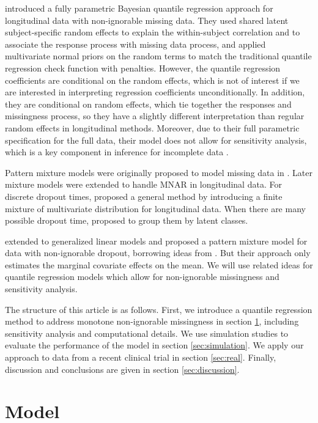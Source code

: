 \documentclass[useAMS,usenatbib,referee]{biom}
\begin{document}
\citet{yuan2010} introduced a fully parametric Bayesian quantile
regression approach for longitudinal data with non-ignorable missing
data. They used shared latent subject-specific random effects to
explain the within-subject correlation and to associate the response
process with missing data process, and applied multivariate normal
priors on the random terms to match the traditional quantile
regression check function with penalties. However, the quantile
regression coefficients are conditional on the random effects, which
is not of interest if we are interested in interpreting regression
coefficients unconditionally.  In addition, they are
conditional on random effects, which tie together the responses and
missingness process, so they have a slightly different interpretation
than regular random effects in longitudinal methods. Moreover, due to
their full parametric specification for the full data, their model
does not allow for sensitivity analysis, which is a key component in
inference for incomplete data \citep{nas2010}.

Pattern mixture models were originally proposed to model missing data
in \citet{rubin1977}. Later mixture models were extended to handle
MNAR in longitudinal data. For discrete dropout times,
\citet{little1993, little1994} proposed a general method by
introducing a finite mixture of multivariate distribution for
longitudinal data. When there are many possible dropout time,
\citet{roy2003} proposed to group them by latent classes.

\citet{roy2008} extended \citet{roy2003} to generalized linear models
and proposed a pattern mixture model for data with non-ignorable
dropout, borrowing ideas from \citet{heagerty1999}.  But their
approach only estimates the marginal covariate effects on the mean. We
will use related ideas for quantile regression models which allow for
non-ignorable missingness and sensitivity analysis.

The structure of this article is as follows. First, we introduce a
quantile regression method to address monotone non-ignorable
missingness in section \ref{sec:model}, including sensitivity analysis
and computational details.  We use simulation studies to evaluate the
performance of the model in section \ref{sec:simulation}. We apply our
approach to data from a recent clinical trial in section
\ref{sec:real}. Finally, discussion and conclusions are given in
section \ref{sec:discussion}.

\section{Model}
\label{sec:model}
\end{document}
